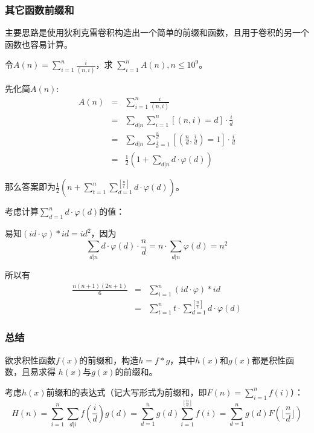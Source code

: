 \subsubsection{其它函数前缀和}
主要思路是使用狄利克雷卷积构造出一个简单的前缀和函数，且用于卷积的另一个函数也容易计算。

令$\displaystyle A(n)=\sum_{i=1}^n\frac{i}{(n,i)}$，求
$\displaystyle \sum_{i=1}^n{A(n)},n\leq 10^{9}$。

先化简$A(n)$:
\begin{eqnarray*}
    A(n)&=&\sum_{i=1}^n\frac{i}{(n,i)}\\
    &=&\sum_{d|n}{\sum_{i=1}^n{[(n,i)=d]\cdot\frac{i}{d}}}\\
    &=&\sum_{d|n}{\sum_{\frac{i}{d}=1}^{\frac{n}{d}}
    {[(\frac{n}{d},\frac{i}{d})=1]\cdot\frac{i}{d}}}\\
    &=&\frac{1}{2}\left(1+\sum_{d|n}{d\cdot\varphi(d)}\right)
\end{eqnarray*}

那么答案即为$\displaystyle \frac{1}{2}\left(n+\sum_{t=1}^n
    {\sum_{d=1}^{[\frac{n}{t}]}{d\cdot\varphi(d)}}\right)$。

考虑计算$\displaystyle \sum_{d=1}^n{d\cdot\varphi(d)}$的值：

易知$(id\cdot\varphi)*id=id^2$，因为\begin{displaymath}
    \sum_{d|n}d\cdot\varphi(d)\cdot\frac{n}{d}=
    n\cdot\sum_{d|n}\varphi(d)=n^2
\end{displaymath}

所以有\begin{eqnarray*}
    \frac{n(n+1)(2n+1)}{6}&=&\sum_{i=1}^n{(id\cdot\varphi)*id}\\
    &=&\sum_{t=1}^n{t\cdot\sum_{d=1}^{[\frac{n}{t}]}{d\cdot\varphi(d)}}
\end{eqnarray*}

\subsubsection{总结}
欲求积性函数$f(x)$的前缀和，构造$h=f*g$，其中$h(x)$和$g(x)$都是积性函数，且易求得
$h(x)$与$g(x)$的前缀和。

考虑$h(x)$前缀和的表达式（记大写形式为前缀和，即$F(n)=\displaystyle \sum_{i=1}^n{f(i)}$）：
\begin{displaymath}
    H(n)=\sum_{i=1}^n{\sum_{d|i}{f(\frac{i}{d})g(d)}}=
    \sum_{d=1}^n{g(d)\sum_{i=1}^{\lfloor\frac{n}{d}\rfloor}{f(i)}}=
    \sum_{d=1}^n{g(d)F(\lfloor\frac{n}{d}\rfloor)}
\end{displaymath}

